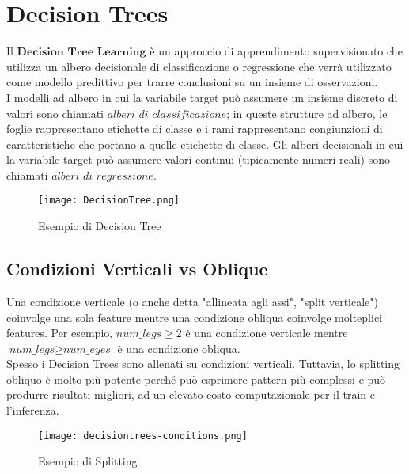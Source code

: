 \section{Decision Trees}

    Il $\textbf{Decision Tree Learning}$ è un approccio di apprendimento supervisionato che utilizza un albero decisionale di classificazione o regressione che verrà utilizzato come modello predittivo per trarre conclusioni su un insieme di osservazioni.
    \\[1\baselineskip]
    I modelli ad albero in cui la variabile target può assumere un insieme discreto di valori sono chiamati $\textit{alberi di classificazione}$; in queste strutture ad albero, le foglie rappresentano etichette di classe e i rami rappresentano congiunzioni di caratteristiche che portano a quelle etichette di classe.
    Gli alberi decisionali in cui la variabile target può assumere valori continui (tipicamente numeri reali) sono chiamati $\textit{alberi di regressione}$.
    
    \begin{figure}[h]
        \caption{Esempio di Decision Tree}
        \centering
        \texttt{[image: DecisionTree.png]}
    \end{figure}

    \subsection{Condizioni Verticali vs Oblique}
        Una condizione verticale (o anche detta "allineata agli assi", "split verticale") coinvolge una sola feature mentre una condizione obliqua coinvolge molteplici features.
        Per esempio, $\textit{num\_legs} \geq 2$ è una condizione verticale mentre $\textit{num\_legs} \geq \textit{num\_eyes}$ è una condizione obliqua.
        \\[1\baselineskip]
        Spesso i Decision Trees sono allenati su condizioni verticali. Tuttavia, lo splitting obliquo è molto più potente perché può esprimere pattern più complessi e può produrre risultati migliori, ad un elevato costo computazionale per il train e l'inferenza.

        \begin{figure}[h]
            \caption{Esempio di Splitting}
            \centering
            \texttt{[image: decisiontrees-conditions.png]}
        \end{figure}

    \clearpage

